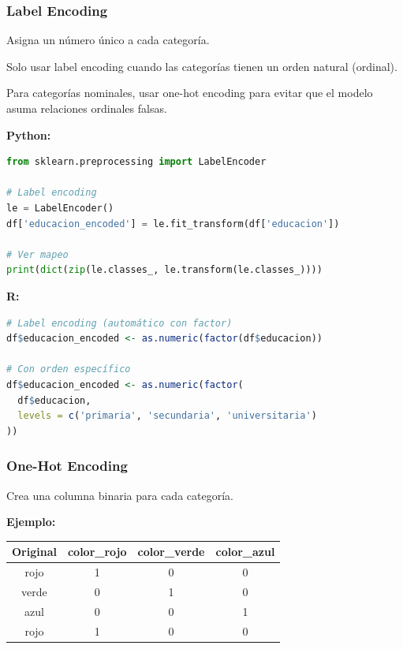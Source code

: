\documentclass[a4paper,11pt]{article}
\begin{document}
\subsubsection{Label Encoding}

Asigna un número único a cada categoría.

\begin{tcolorbox}[colback=advertenciacolor!20, colframe=red, title=Cuidado con Label Encoding]
Solo usar label encoding cuando las categorías tienen un orden natural (ordinal).

Para categorías nominales, usar one-hot encoding para evitar que el modelo asuma relaciones ordinales falsas.
\end{tcolorbox}

\textbf{Python:}
\begin{lstlisting}[language=Python]
from sklearn.preprocessing import LabelEncoder

# Label encoding
le = LabelEncoder()
df['educacion_encoded'] = le.fit_transform(df['educacion'])

# Ver mapeo
print(dict(zip(le.classes_, le.transform(le.classes_))))
\end{lstlisting}

\textbf{R:}
\begin{lstlisting}[language=R]
# Label encoding (automático con factor)
df$educacion_encoded <- as.numeric(factor(df$educacion))

# Con orden específico
df$educacion_encoded <- as.numeric(factor(
  df$educacion,
  levels = c('primaria', 'secundaria', 'universitaria')
))
\end{lstlisting}

\subsubsection{One-Hot Encoding}

Crea una columna binaria para cada categoría.

\textbf{Ejemplo:}

\begin{center}
\begin{tabular}{|c|c|c|c|}
\hline
\textbf{Original} & \textbf{color\_rojo} & \textbf{color\_verde} & \textbf{color\_azul} \\
\hline
rojo & 1 & 0 & 0 \\
verde & 0 & 1 & 0 \\
azul & 0 & 0 & 1 \\
rojo & 1 & 0 & 0 \\
\hline
\end{tabular}
\end{center}
\end{document}
